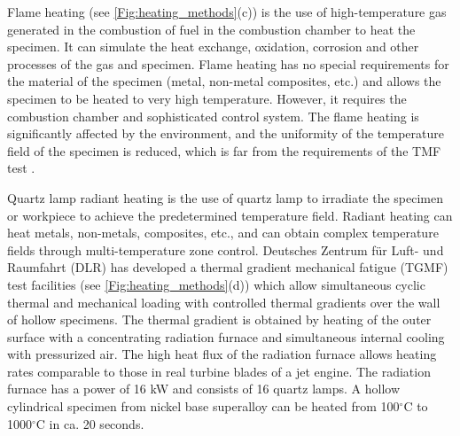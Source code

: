 Flame heating (see \ref{Fig:heating_methods}(c)) is the use of high-temperature gas generated in the combustion of fuel in the combustion chamber to heat the specimen. It can simulate the heat exchange, oxidation, corrosion and other processes of the gas and specimen. Flame heating has no special requirements for the material of the specimen (metal, non-metal composites, etc.) and allows the specimen to be heated to very high temperature. However, it requires the combustion chamber and sophisticated control system. The flame heating is significantly affected by the environment, and the uniformity of the temperature field of the specimen is reduced, which is far from the requirements of the TMF test \cite{MAUGET2017225}.

Quartz lamp radiant heating is the use of quartz lamp to irradiate the specimen or workpiece to achieve the predetermined temperature field. Radiant heating can heat metals, non-metals, composites, etc., and can obtain complex temperature fields through multi-temperature zone control.
Deutsches Zentrum f\"{u}r Luft- und Raumfahrt (DLR) \cite{BAUFELD2008219} has developed a thermal gradient mechanical fatigue (TGMF) test facilities (see \ref{Fig:heating_methods}(d)) which allow simultaneous cyclic thermal and mechanical loading with controlled thermal gradients over the wall of hollow specimens. The thermal gradient is obtained by heating of the outer surface with a concentrating radiation furnace and simultaneous internal cooling with pressurized air. The high heat flux of the radiation furnace allows heating rates comparable to those in real turbine blades of a jet engine. The radiation furnace has a power of 16 kW and consists of 16 quartz lamps. A hollow cylindrical specimen from nickel base superalloy can be heated from 100$^\circ$C to 1000$^\circ$C in ca. 20 seconds. 

